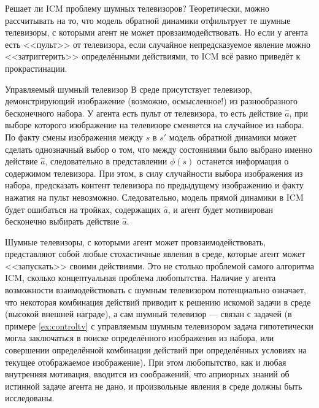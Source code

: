 Решает ли ICM проблему шумных телевизоров? Теоретически, можно рассчитывать на то, что модель обратной динамики отфильтрует те шумные телевизоры, с которыми агент не может провзаимодействовать. Но если у агента есть <<пульт>> от телевизора, если случайное непредсказуемое явление можно <<затриггерить>> определёнными действиями, то ICM всё равно приведёт к прокрастинации.

\begin{exampleBox}[label=ex:controltv]{Управляемый шумный телевизор}
В среде присутствует телевизор, демонстрирующий изображение (возможно, осмысленное!) из разнообразного бесконечного набора. У агента есть пульт от телевизора, то есть действие $\hat{a}$, при выборе которого изображение на телевизоре сменяется на случайное из набора. По факту смены изображения между $s$ в $s'$ модель обратной динамики может сделать однозначный выбор о том, что между состояниями было выбрано именно действие $\hat{a}$, следовательно в представлении $\phi(s)$ останется информация о содержимом телевизора. При этом, в силу случайности выбора изображения из набора, предсказать контент телевизора по предыдущему изображению и факту нажатия на пульт невозможно. Следовательно, модель прямой динамики в ICM будет ошибаться на тройках, содержащих $\hat{a}$, и агент будет мотивирован бесконечно выбирать действие $\hat{a}$.
\end{exampleBox}


Шумные телевизоры, с которыми агент может провзаимодействовать, представляют собой любые стохастичные явления в среде, которые агент может <<запускать>> своими действиями. Это не столько проблемой самого алгоритма ICM, сколько концептуальная проблема любопытства. Наличие у агента возможности взаимодействовать с шумным телевизором потенциально означает, что некоторая комбинация действий приводит к решению искомой задачи в среде (высокой внешней награде), а сам шумный телевизор --- связан с задачей (в примере \ref{ex:controltv} с управляемым шумным телевизором задача гипотетически могла заключаться в поиске определённого изображения из набора, или совершении определённой комбинации действий при определённых условиях на текущее отображаемое изображение). При этом любопытство, как и любая внутренняя мотивация, вводится из соображений, что априорных знаний об истинной задаче агента не дано, и произвольные явления в среде должны быть исследованы.

